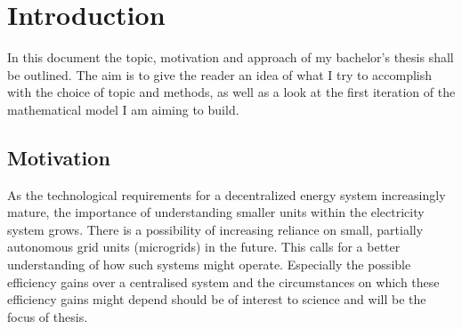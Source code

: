 \documentclass[
	11pt,								%
	DIV10,								%
	a4paper,         					%
	oneside,							%
	headheight=20pt,					%
	footheight=20pt,					%
    parskip=full,						%
    listof=totoc,						%
	bibliography=totoc,					%
	index=totoc,						%
]{scrartcl}
\begin{document}



\section{Introduction}
In this document the topic, motivation and approach of my bachelor’s thesis shall be outlined. The aim is to give the reader an idea of what I try to accomplish with the choice of topic and methods, as well as a look at the first iteration of the mathematical model I am aiming to build.


\subsection{Motivation}
As the technological requirements for a decentralized energy system increasingly mature, the importance of understanding smaller units within the electricity system grows. There is a possibility of increasing reliance on small, partially autonomous grid units (microgrids) in the future. This calls for a better understanding of how such systems might operate. Especially the possible efficiency gains over a centralised system and the circumstances on which these efficiency gains might depend should be of interest to science and will be the focus of thesis.

\end{document}

